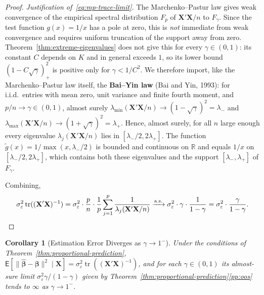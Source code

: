 \documentclass[14pt]{extarticle}
\theoremstyle{plain}
\newtheorem{corollary}[theorem]{Corollary}
\theoremstyle{definition}
\theoremstyle{remark}
\newcommand\expc{\mathsf{E}}
\DeclareMathOperator\tr{tr}
\newcommand{\bX}{\mathbf{X}}
\def\bb{\boldsymbol{\beta}}
\newcommand{\Real}{\mathbb{R}}
\newcommand{\hbb}{\hat{\boldsymbol{\beta}}}
\begin{document}
\begin{proof}
\medskip\noindent\emph{Justification of~\eqref{eq:mp-trace-limit}.} The Marchenko--Pastur law gives weak convergence of the empirical spectral distribution $F_p$ of $\bX'\bX/n$ to $F_\gamma$. Since the test function $g(x) = 1/x$ has a pole at zero, this is \emph{not} immediate from weak convergence and requires uniform truncation of the support away from zero. Theorem~\ref{thm:extreme-eigenvalues} does not give this for every $\gamma \in (0,1)$: its constant $C$ depends on $K$ and in general exceeds $1$, so its lower bound $(1 - C\sqrt\gamma)_+^2$ is positive only for $\gamma < 1/C^2$. We therefore import, like the Marchenko--Pastur law itself, the \textbf{Bai--Yin law} (Bai and Yin, 1993): for i.i.d.\ entries with mean zero, unit variance and finite fourth moment, and $p/n \to \gamma \in (0,1)$, almost surely $\lambda_{\min}(\bX'\bX/n) \to (1 - \sqrt\gamma)^2 = \lambda_-$ and $\lambda_{\max}(\bX'\bX/n) \to (1 + \sqrt\gamma)^2 = \lambda_+$. Hence, almost surely, for all $n$ large enough every eigenvalue $\lambda_j(\bX'\bX/n)$ lies in $[\lambda_-/2, 2\lambda_+]$. The function $\tilde g(x) = 1/\max(x, \lambda_-/2)$ is bounded and continuous on $\Real$ and equals $1/x$ on $[\lambda_-/2, 2\lambda_+]$, which contains both these eigenvalues and the support $[\lambda_-, \lambda_+]$ of $F_\gamma$. 

\medskip\noindent Combining,
\[
\sigma_\varepsilon^2\tr((\bX'\bX)^{-1}) = \sigma_\varepsilon^2 \cdot \frac{p}{n}\cdot\frac{1}{p}\sum_{j=1}^p\frac{1}{\lambda_j(\bX'\bX/n)} \xrightarrow{\text{a.s.}} \sigma_\varepsilon^2\cdot\gamma\cdot\frac{1}{1-\gamma} = \sigma_\varepsilon^2\cdot\frac{\gamma}{1-\gamma}. \qedhere
\]
\end{proof}

\begin{corollary}[Estimation Error Diverges as $\gamma \to 1^-$]\label{cor:estimation-diverges}
Under the conditions of Theorem~\ref{thm:proportional-prediction}, $\expc[\|\hbb - \bb\|^2 \mid \bX] = \sigma_\varepsilon^2\tr((\bX'\bX)^{-1})$, and for each $\gamma \in (0,1)$ its almost-sure limit $\sigma_\varepsilon^2\gamma/(1-\gamma)$ given by Theorem~\ref{thm:proportional-prediction}\ref{pp:oos} tends to $\infty$ as $\gamma \to 1^-$.
\end{corollary}
\end{document}
